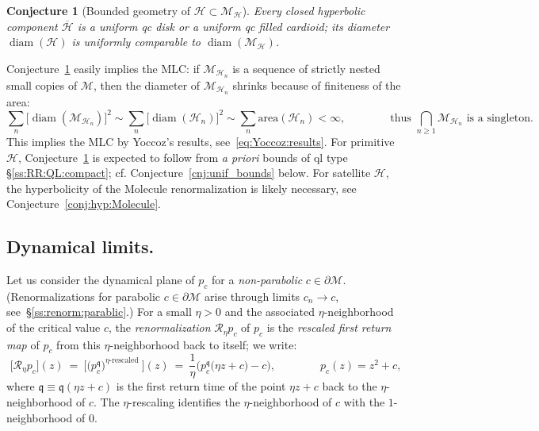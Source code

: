 \documentclass[twoside,leqno]{article}
\theoremstyle{plain}
\newtheorem{conj}[thm]{Conjecture}
\newcommand{\diam}{\operatorname{diam}}
\newcommand\MM{{\mathcal{M}}}
\newcommand\HH{{\mathcal{H}}}
\newcommand{\qq}{\mathfrak{q}}
\newcommand{\RR}{{\mathcal R}}
\begin{document}
\begin{conj}[Bounded geometry of $\HH\subset \MM_\HH$] \label{cnj:hyp_comp} Every closed hyperbolic component $\overline \HH$ is a uniform qc disk or a uniform qc filled cardioid; its diameter $\diam (\HH)$ is uniformly comparable to $\diam(\MM_\HH)$. 
\end{conj}
Conjecture~\ref{cnj:hyp_comp} easily implies the MLC: if $\MM_{\HH_n}$ is a sequence of strictly nested small copies of $\MM$, then the diameter of $\MM_{\HH_n}$ shrinks because of finiteness of the area:
\[\sum_n\big[\diam (\MM_{\HH_n})\big]^2\sim \sum_n\big[\diam (\HH_n)\big]^2\sim \sum_n\text{area}(\HH_n)<\infty,\qquad \qquad\text{thus }\bigcap_{n\ge 1} \MM_{\HH_n}\text{ is a singleton.}\]
This implies the MLC by Yoccoz's results, see~\eqref{eq:Yoccoz:results}. For primitive $\HH$, Conjecture~\ref{cnj:hyp_comp} is expected to follow from \emph{a priori} bounds of ql type \S\ref{ss:RR:QL:compact}; cf. Conjecture~\ref{cnj:unif_bounds} below. For satellite $\HH$, the hyperbolicity of the Molecule renormalization is likely necessary, see Conjecture~\ref{conj:hyp:Molecule}. 





\subsection{Dynamical limits.}\label{ss:resc:dynam} Let us consider the dynamical plane of $p_c$ for a \emph{non-parabolic} $c\in \partial \MM$. (Renormalizations for parabolic $c\in \partial\MM$ arise through limits $c_n\to c$, see~\S\ref{ss:renorm:parablic}.) For a small $\eta>0$ and the associated $\eta$-neighborhood of the critical value $c$, the \emph{renormalization} $\RR_\eta p_c$ of $p_c$ is the \emph{rescaled first return map} of $p_c$ from this $\eta$-neighborhood back to itself; we write:
\begin{equation}
    \label{eq:dfn:Rf} \big[\RR_\eta p_c\big](z) \ =\ \Big[\big(p_c^{\qq}\big)^\text{$\eta$-rescaled}\ \Big] (z) \ =\ \frac{1}{\eta}\Big(p_c^{\qq} \big(\eta z+c\big)-c\Big),\qquad\qquad p_c(z)=z^2+c,
\end{equation}
where $\qq\equiv \qq(\eta z+c)$ is the first return time of the point $\eta z+c$ back to the $\eta$-neighborhood of $c$. The $\eta$-rescaling identifies the $\eta$-neighborhood of $c$ with the $1$-neighborhood of $0$.
\end{document}
